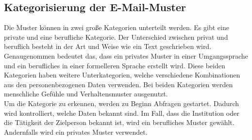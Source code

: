 	\subsection{Kategorisierung der E-Mail-Muster}
	Die Muster können in zwei große Kategorien unterteilt werden. Es gibt eine private und eine berufliche Kategorie. Der Unterschied zwischen privat und beruflich besteht in der Art und Weise wie ein Text geschrieben wird. Genaugenommen bedeutet das, dass ein privates Muster in einer Umgangssprache und ein berufliches in einer formelleren Sprache erstellt wird. Diese beiden Kategorien haben weitere Unterkategorien, welche verschiedene Kombinationen aus den personenbezogenen Daten verwenden. Bei beiden Kategorien werden menschliche Gefühle und Verhaltensmuster ausgenutzt.\\
	Um die Kategorie zu erkennen, werden zu Beginn Abfragen gestartet. Dadurch wird kontrolliert, welche Daten bekannt sind. Im Fall, dass die Institution oder die Tätigkeit der Zielperson bekannt ist, wird ein berufliches Muster gewählt. Andernfalls wird ein privates Muster verwendet.
	
